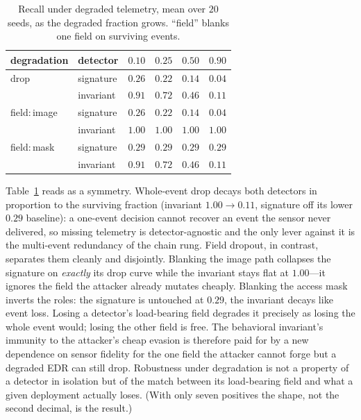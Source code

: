\documentclass[sigconf,nonacm]{acmart}
\begin{document}
\begin{table}[t]
\caption{Recall under degraded telemetry, mean over $20$ seeds, as the degraded
fraction grows. ``field'' blanks one field on surviving events.}
\label{tab:degraded}
\small
\begin{tabular}{@{}llcccc@{}}
\toprule
degradation & detector & $0.10$ & $0.25$ & $0.50$ & $0.90$ \\
\midrule
drop            & signature & $0.26$ & $0.22$ & $0.14$ & $0.04$ \\
                & invariant & $0.91$ & $0.72$ & $0.46$ & $0.11$ \\
field:\,image   & signature & $0.26$ & $0.22$ & $0.14$ & $0.04$ \\
                & invariant & $1.00$ & $1.00$ & $1.00$ & $1.00$ \\
field:\,mask    & signature & $0.29$ & $0.29$ & $0.29$ & $0.29$ \\
                & invariant & $0.91$ & $0.72$ & $0.46$ & $0.11$ \\
\bottomrule
\end{tabular}
\end{table}

Table~\ref{tab:degraded} reads as a symmetry. Whole-event drop decays both
detectors in proportion to the surviving fraction (invariant $1.00\!\rightarrow\!
0.11$, signature off its lower $0.29$ baseline): a one-event decision cannot
recover an event the sensor never delivered, so missing telemetry is
detector-agnostic and the only lever against it is the multi-event redundancy of
the chain rung. Field dropout, in contrast, separates them cleanly and
disjointly. Blanking the image path collapses the signature on \emph{exactly} its
drop curve while the invariant stays flat at $1.00$---it ignores the field the
attacker already mutates cheaply. Blanking the access mask inverts the roles: the
signature is untouched at $0.29$, the invariant decays like event loss. Losing a
detector's load-bearing field degrades it precisely as losing the whole event
would; losing the other field is free. The behavioral invariant's immunity to the
attacker's cheap evasion is therefore paid for by a new dependence on sensor
fidelity for the one field the attacker cannot forge but a degraded EDR can still
drop. Robustness under degradation is not a property of a detector in isolation
but of the match between its load-bearing field and what a given deployment
actually loses. (With only seven positives the shape, not the second decimal, is
the result.)
\end{document}
